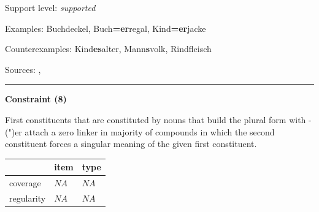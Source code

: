 \vspace{-1.35em}

\noindent
Support level: \textit{supported}

\vspace{0.3em}

\noindent
Examples: Buch{\zeroLinker}deckel, Buch\textbf{=er}regal, Kind\textbf{=er}jacke

\noindent
Counterexamples: Kind\textbf{es}alter, Mann\textbf{s}volk, Rind{\zeroLinker}fleisch

\vspace{0.3em}

\noindent
Sources: \citet[229]{eisenberg_2013}, \citet[99]{ortner_mueller-bollhagen_1991}

\vspace{0.35em}
\hrule




\vspace{0.4em}

\begin{center}
\textbf{Constraint (8)}
\end{center}

\noindent
First constituents that are constituted by nouns that build the plural form with -(")er attach a zero linker in majority of compounds in which the second constituent forces a singular meaning of the given first constituent.
\vspace{0.5em}


\vspace{-0.25em}

\begin{table}[!ht]
\begin{center}
\setlength{\extrarowheight}{1pt}
\begin{tabularx}{\columnwidth}{|X|X|X|}
\hline
 & item & type \\
\hline
 coverage & $NA$ & $NA$ \\
\hline
 regularity & $NA$ & $NA$ \\
\hline
\end{tabularx}
\end{center}
\end{table}

